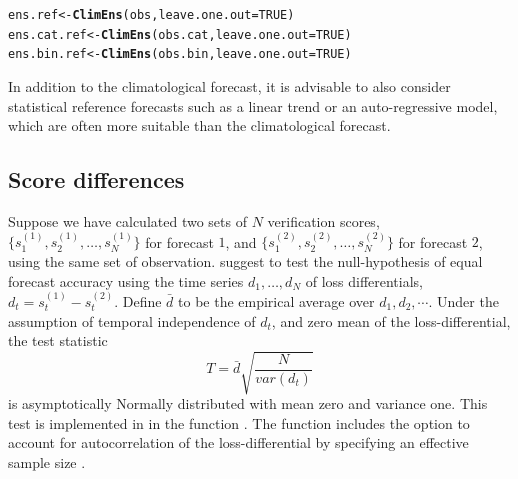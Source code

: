 \documentclass[article]{jss}\usepackage{graphicx, color}
\makeatletter
\newcommand{\hlfunctioncall}[1]{\textcolor[rgb]{0,0.501960784313725,0.752941176470588}{\textbf{#1}}}%
\newenvironment{kframe}{%
 \def\at@end@of@kframe{}%
 \ifinner\ifhmode%
  \def\at@end@of@kframe{\end{minipage}}%
  \begin{minipage}{\columnwidth}%
 \fi\fi%
 \def\FrameCommand##1{\hskip\@totalleftmargin \hskip-\fboxsep
 \colorbox{shadecolor}{##1}\hskip-\fboxsep
     \hskip-\linewidth \hskip-\@totalleftmargin \hskip\columnwidth}%
 \MakeFramed {\advance\hsize-\width
   \@totalleftmargin\z@ \linewidth\hsize
   \@setminipage}}%
 {\par\unskip\endMakeFramed%
 \at@end@of@kframe}
\newenvironment{knitrout}{}{} %
\makeatother
\begin{document}
\begin{knitrout}
\color{fgcolor}\begin{kframe}
\begin{alltt}
ens.ref     <- \hlfunctioncall{ClimEns}(obs,     leave.one.out=TRUE)
ens.cat.ref <- \hlfunctioncall{ClimEns}(obs.cat, leave.one.out=TRUE)
ens.bin.ref <- \hlfunctioncall{ClimEns}(obs.bin, leave.one.out=TRUE)
\end{alltt}
\end{kframe}
\end{knitrout}


In addition to the climatological forecast, it is advisable to also consider statistical reference forecasts such as a linear trend or an auto-regressive model, which are often more suitable than the climatological forecast.



\subsection{Score differences}

Suppose we have calculated two sets of $N$ verification scores, $\{s^{(1)}_1, s^{(1)}_2, \dots, s^{(1)}_N\}$ for forecast $1$, and $\{s^{(2)}_1, s^{(2)}_2, \dots, s^{(2)}_N\}$ for forecast $2$, using the same set of observation.
\citet{diebold1995comparing} suggest to test the null-hypothesis of equal forecast accuracy using the time series $d_1, \dots, d_N$ of loss differentials, $d_t = s^{(1)}_t - s^{(2)}_t$. 
Define $\bar{d}$ to be the empirical average over $d_1, d_2, \cdots$.
Under the assumption of temporal independence of $d_t$, and zero mean of the loss-differential, the test statistic 
%
\begin{equation}
T = \bar{d}\sqrt{\frac{N}{var(d_t)}}
\end{equation}
%
is asymptotically Normally distributed with mean zero and variance one.
This test is implemented in  in the function .
The function includes the option to account for autocorrelation of the loss-differential by specifying an effective sample size .
\end{document}

